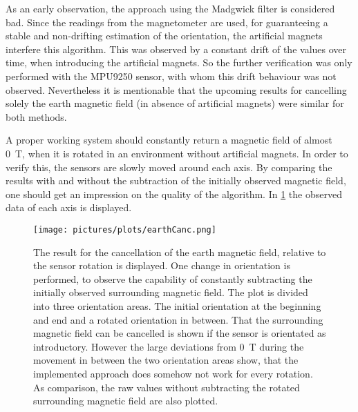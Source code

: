 As an early observation, the approach using the Madgwick filter is considered bad. Since the readings from the magnetometer are used, for guaranteeing a stable and non-drifting estimation of the orientation, the artificial magnets interfere this algorithm. This was observed by a constant drift of the values over time, when introducing the artificial magnets. So the further verification was only performed with the MPU9250 sensor, with whom this drift behaviour was not observed. Nevertheless it is mentionable that the upcoming results for cancelling solely the earth magnetic field (in absence of artificial magnets) were similar for both methods.

A proper working system should constantly return a magnetic field of almost \SI{0}{\tesla}, when it is rotated in an environment without artificial magnets. In order to verify this, the sensors are slowly moved around each axis. By comparing the results with and without the subtraction of the initially observed magnetic field, one should get an impression on the quality of the algorithm. In \ref{fig:earthCancelRes} the observed data of each axis is displayed.
\begin{figure}[h]
\centering
\texttt{[image: pictures/plots/earthCanc.png]} 
\caption[Quality of earth cancellation]
{The result for the cancellation of the earth magnetic field, relative to the sensor rotation is displayed. One change in orientation is performed, to observe the capability of constantly subtracting the initially observed surrounding magnetic field. The plot is divided into three orientation areas. The initial orientation at the beginning and end and a rotated orientation in between. That the surrounding magnetic field can be cancelled is shown if the sensor is orientated as introductory. However the large deviations from \SI{0}{\tesla} during the movement in between the two orientation areas show, that the implemented approach does somehow not work for every rotation. As comparison, the raw values without subtracting the rotated surrounding magnetic field are also plotted.}
\label{fig:earthCancelRes}
\end{figure}
